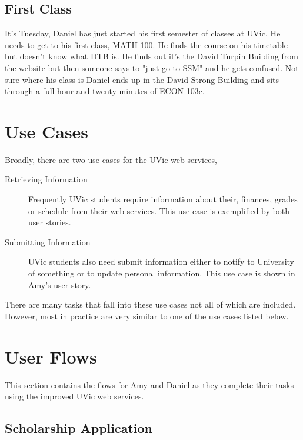 \documentclass{article}
\begin{document}
\subsection{First Class}

It's Tuesday, Daniel has just started his first semester of classes at UVic. He needs to get to his first class, MATH 100. He finds the course on his timetable but doesn't know what DTB is. He finds out it's the David Turpin Building from the website but then someone says to "just go to SSM" and he gets confused. Not sure where his class is Daniel ends up in the David Strong Building and sits through a full hour and twenty minutes of ECON 103c.


\section{Use Cases}

Broadly, there are two use cases for the UVic web services,

\begin{description}
  \item[Retrieving Information] Frequently UVic students require information about their, finances, grades or schedule from their web services. This use case is exemplified by both user stories.
  \item[Submitting Information] UVic students also need submit information either to notify to University of something or to update personal information. This use case is shown in Amy's user story.
\end{description}

There are many tasks that fall into these use cases not all of which are included. However, most in practice are very similar to one of the use cases listed below.

\section{User Flows}

This section contains the flows for Amy and Daniel as they complete their tasks using the improved UVic web services.

\subsection{Scholarship Application}
\end{document}
